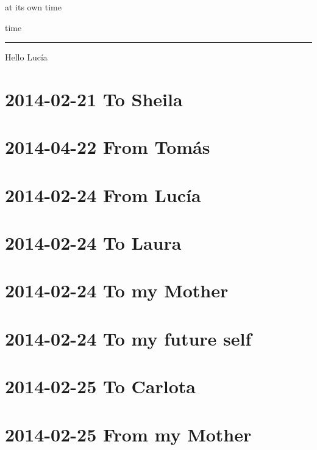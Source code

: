 \documentclass[]{book}
\begin{document}
at its own time

time

\begin{center}\rule{0.5\linewidth}{\linethickness}\end{center}

Hello Lucía

\hypertarget{to-sheila}{%
\section{2014-02-21 To Sheila}\label{to-sheila}}

\hypertarget{from-tomas-1}{%
\section{2014-04-22 From Tomás}\label{from-tomas-1}}

\hypertarget{from-lucia}{%
\section{2014-02-24 From Lucía}\label{from-lucia}}

\hypertarget{to-laura}{%
\section{2014-02-24 To Laura}\label{to-laura}}

\hypertarget{to-my-mother}{%
\section{2014-02-24 To my Mother}\label{to-my-mother}}

\hypertarget{to-my-future-self}{%
\section{2014-02-24 To my future self}\label{to-my-future-self}}

\hypertarget{to-carlota}{%
\section{2014-02-25 To Carlota}\label{to-carlota}}

\hypertarget{from-my-mother}{%
\section{2014-02-25 From my Mother}\label{from-my-mother}}
\end{document}
